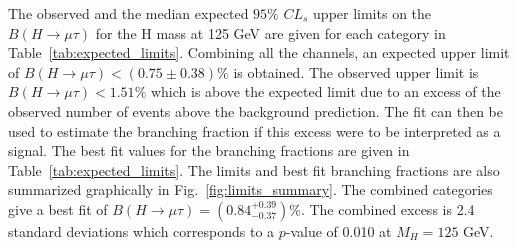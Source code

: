 \documentclass[oneside, letterpaper, oldfontcommands]{memoir}
\begin{document}
 The observed and the median expected $95\%$ $CL_{s}$ upper limits on the $B(H \rightarrow \mu \tau )$ for the H mass at 125 GeV are given for each category
 in Table~\ref{tab:expected_limits}.  Combining all
the channels, an expected upper limit of $B(H \rightarrow \mu \tau )<(0.75 \pm 0.38)\%$ is obtained. The
observed upper limit is $B(H \rightarrow \mu \tau ) < 1.51\%$ which is above the expected limit due to an excess of the
observed number of events above the background prediction.
The fit can then be used to estimate the branching fraction if this excess were to be interpreted as a signal.
The best fit values for the branching fractions are given in Table~\ref{tab:expected_limits}.
The limits and best fit branching fractions are also  summarized graphically  in
Fig.~\ref{fig:limits_summary}. The combined categories give a best fit of $B(H \rightarrow \mu \tau )=(0.84^{+0.39}_{-0.37})\%$. The combined excess is 2.4 standard deviations which corresponds to a  $p$-value of 0.010 at $M_{H}=125$ GeV.
\end{document}
